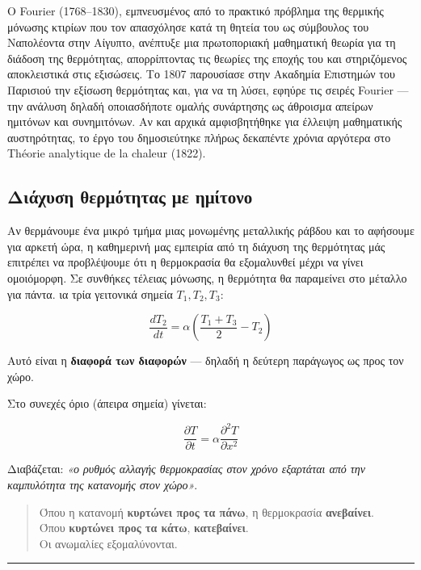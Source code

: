 \documentclass[
  a4paper,
  11pt,
]{article}
\begin{document}
Ο Fourier (1768--1830), εμπνευσμένος από το πρακτικό πρόβλημα της
θερμικής μόνωσης κτιρίων που τον απασχόλησε κατά τη θητεία του ως
σύμβουλος του Ναπολέοντα στην Αίγυπτο, ανέπτυξε μια πρωτοποριακή
μαθηματική θεωρία για τη διάδοση της θερμότητας, απορρίπτοντας τις
θεωρίες της εποχής του και στηριζόμενος αποκλειστικά στις εξισώσεις. Το
1807 παρουσίασε στην Ακαδημία Επιστημών του Παρισιού την εξίσωση
θερμότητας και, για να τη λύσει, εφηύρε τις σειρές Fourier --- την
ανάλυση δηλαδή οποιασδήποτε ομαλής συνάρτησης ως άθροισμα απείρων
ημιτόνων και συνημιτόνων. Αν και αρχικά αμφισβητήθηκε για έλλειψη
μαθηματικής αυστηρότητας, το έργο του δημοσιεύτηκε πλήρως δεκαπέντε
χρόνια αργότερα στο Théorie analytique de la chaleur (1822).

\subsection{Διάχυση θερμότητας με
ημίτονο}\label{ux3b4ux3b9ux3acux3c7ux3c5ux3c3ux3b7-ux3b8ux3b5ux3c1ux3bcux3ccux3c4ux3b7ux3c4ux3b1ux3c2-ux3bcux3b5-ux3b7ux3bcux3afux3c4ux3bfux3bdux3bf}

Αν θερμάνουμε ένα μικρό τμήμα μιας μονωμένης μεταλλικής ράβδου και το
αφήσουμε για αρκετή ώρα, η καθημερινή μας εμπειρία από τη διάχυση της
θερμότητας μάς επιτρέπει να προβλέψουμε ότι η θερμοκρασία θα εξομαλυνθεί
μέχρι να γίνει ομοιόμορφη. Σε συνθήκες τέλειας μόνωσης, η θερμότητα θα
παραμείνει στο μέταλλο για πάντα. ια τρία γειτονικά σημεία
\(T_1, T_2, T_3\):

\[\frac{dT_2}{dt} = \alpha \left(\frac{T_1 + T_3}{2} - T_2\right)\]

Αυτό είναι η \textbf{διαφορά των διαφορών} --- δηλαδή η δεύτερη
παράγωγος ως προς τον χώρο.

Στο συνεχές όριο (άπειρα σημεία) γίνεται:

\[\frac{\partial T}{\partial t} = \alpha \frac{\partial^2 T}{\partial x^2}\]

Διαβάζεται: \emph{«ο ρυθμός αλλαγής θερμοκρασίας στον χρόνο εξαρτάται
από την καμπυλότητα της κατανομής στον χώρο»}.

\begin{quote}
Όπου η κατανομή \textbf{κυρτώνει προς τα πάνω}, η θερμοκρασία
\textbf{ανεβαίνει}.\\
Όπου \textbf{κυρτώνει προς τα κάτω}, \textbf{κατεβαίνει}.\\
Οι ανωμαλίες εξομαλύνονται.
\end{quote}

\begin{center}\rule{0.5\linewidth}{0.5pt}\end{center}
\end{document}
